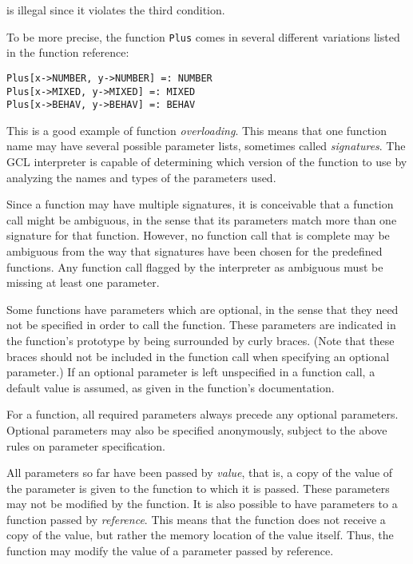 \noindent is illegal since it violates the third condition.

To be more precise, the function {\tt Plus} comes in several different
variations listed in the function reference:

\begin{verbatim}
Plus[x->NUMBER, y->NUMBER] =: NUMBER
Plus[x->MIXED, y->MIXED] =: MIXED
Plus[x->BEHAV, y->BEHAV] =: BEHAV 
\end{verbatim}

\noindent This is a good example of function {\it overloading}.  This
means that one function name may have several possible parameter
lists, sometimes called {\it signatures}.  The GCL interpreter is
capable of determining which version of the function to use by
analyzing the names and types of the parameters used.

Since a function may have multiple signatures, it is conceivable that
a function call might be ambiguous, in the sense that its parameters
match more than one signature for that function.  However, no function
call that is complete may be ambiguous from the way that signatures
have been chosen for the predefined functions.  Any function call
flagged by the interpreter as ambiguous must be missing at least one
parameter.

Some functions have parameters which are optional, in the sense that
they need not be specified in order to call the function.  These
parameters are indicated in the function's prototype by being
surrounded by curly braces.  (Note that these braces should not be
included in the function call when specifying an optional parameter.)
If an optional parameter is left unspecified in a function call, a
default value is assumed, as given in the function's documentation.

For a function, all required parameters always precede any optional
parameters.  Optional parameters may also be specified anonymously,
subject to the above rules on parameter specification.

All parameters so far have been passed by {\it value}, that is, a copy
of the value of the parameter is given to the function to which it is
passed.  These parameters may not be modified by the function.  It is
also possible to have parameters to a function passed by {\it
reference}.  This means that the function does not receive a copy of
the value, but rather the memory location of the value itself.  Thus,
the function may modify the value of a parameter passed by reference.

